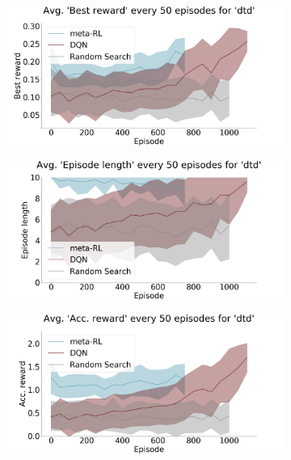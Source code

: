 \begin{figure}[ht]
\begin{subfigure}{.33\textwidth}
  \caption{} 
\label{fig:results:exp1:evolution:f}
\end{subfigure}
\begin{subfigure}{.33\textwidth}
  \centering
      \includegraphics[width=\linewidth]{imgs/chained/average-best_reward-dtd.png}
  \caption{}
\label{fig:results:exp1:evolution:g}
\end{subfigure}%
\begin{subfigure}{.33\textwidth}
  \centering
      \includegraphics[width=\linewidth]{imgs/chained/average-ep_length-dtd.png}
  \caption{} 
\label{fig:results:exp1:evolution:h}
\end{subfigure}%
\begin{subfigure}{.33\textwidth}
  \centering
      \includegraphics[width=\linewidth]{imgs/chained/average-acc_reward-dtd.png}

\end{subfigure}
\end{figure}

